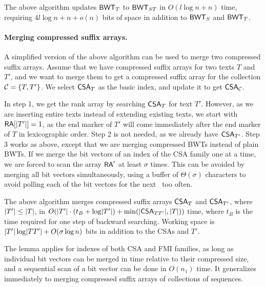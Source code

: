 \begin{lemma}
The above algorithm updates $\mathsf{BWT}_{T}$ to $\mathsf{BWT}_{ST}$ in $O(l \log n + n)$ time, requiring $4l \log n + n + o(n)$ bits of space in addition to $\mathsf{BWT}_{S}$ and $\mathsf{BWT}_{T}$.
\end{lemma}

\paragraph{Merging compressed suffix arrays.}

A simplified version of the above algorithm can be used to merge two compressed suffix arrays. Assume that we have compressed suffix arrays for two texts $T$ and $T'$, and we want to merge them to get a compressed suffix array for the collection $\mathcal{C} = \{ T, T' \}$. We select $\mathsf{CSA}_{T}$ as the basic index, and update it to get $\mathsf{CSA}_{\mathcal{C}}$.

In step 1, we get the rank array by searching $\mathsf{CSA}_{T}$ for text $T'$. However, as we are inserting entire texts instead of extending existing texts, we start with $\mathsf{RA}[\lvert T' \rvert] = 1$, as the end marker of $T'$ will come immediately after the end marker of $T$ in lexicographic order. Step 2 is not needed, as we already have $\mathsf{CSA}_{T'}$. Step 3 works as above, except that we are merging compressed BWTs instead of plain BWTs. If we merge the bit vectors of an index of the CSA family one at a time, we are forced to scan the array $\mathsf{RA}'$ at least $\sigma$ times. This can be avoided by merging all bit vectors simultaneously, using a buffer of $\Theta(\sigma)$ characters to avoid polling each of the bit vectors for the next \onebit\ too often.

\begin{lemma}\label{lemma:merging}
The above algorithm merges compressed suffix arrays $\mathsf{CSA}_{T}$ and $\mathsf{CSA}_{T'}$, where $\lvert T' \rvert \le \lvert T \rvert$, in $O(\lvert T' \rvert \cdot (t_{B} + \log \lvert T' \rvert) + \min(\lvert \mathsf{CSA}_{TT'} \rvert, \lvert T \rvert))$ time, where $t_{B}$ is the time required for one step of backward searching. Working space is $\lvert T' \rvert \log \lvert TT' \rvert + O(\sigma \log n)$ bits in addition to the CSAs and $T'$.
\end{lemma}

The lemma applies for indexes of both CSA and FMI families, as long as individual bit vectors can be merged in time relative to their compressed size, and a sequential scan of a bit vector can be done in $O(n_{1})$ time. It generalizes immediately to merging compressed suffix arrays of collections of sequences.

